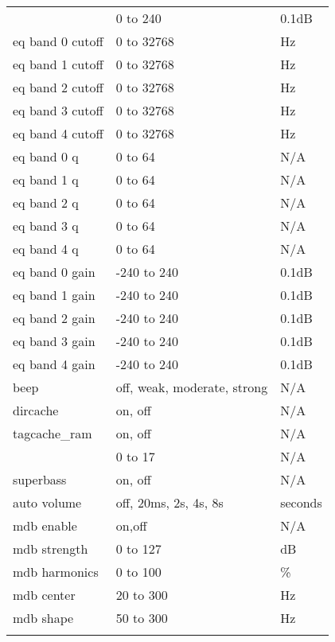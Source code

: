 \begin{center}
\begin{longtable}{@{}>{\raggedright}p{}@{}>{\raggedright}p{}@{}p{}@{}}
{      eq precut     & 0 to 240          & 0.1dB\\
      eq band 0 cutoff & 0 to 32768     & Hz\\
      eq band 1 cutoff & 0 to 32768     & Hz\\
      eq band 2 cutoff & 0 to 32768     & Hz\\
      eq band 3 cutoff & 0 to 32768     & Hz\\
      eq band 4 cutoff & 0 to 32768     & Hz\\
      eq band 0 q   & 0 to 64           & N/A\\
      eq band 1 q   & 0 to 64           & N/A\\
      eq band 2 q   & 0 to 64           & N/A\\
      eq band 3 q   & 0 to 64           & N/A\\
      eq band 4 q   & 0 to 64           & N/A\\
      eq band 0 gain & -240 to 240      & 0.1dB\\
      eq band 1 gain & -240 to 240      & 0.1dB\\
      eq band 2 gain & -240 to 240      & 0.1dB\\
      eq band 3 gain & -240 to 240      & 0.1dB\\
      eq band 4 gain & -240 to 240      & 0.1dB\\
%
      beep          & off, weak, moderate, strong
                                        & N/A\\
      dircache      & on, off           & N/A\\
      tagcache\_ram & on, off           & N/A\\
    }%

    \opt{recorder,recorderv2fm}{
      loudness      & 0 to 17           & N/A\\
      superbass     & on, off           & N/A\\
      auto volume   & off, 20ms, 2s, 4s, 8s
                                        & seconds\\
      mdb enable    & on,off            & N/A\\
      mdb strength  & 0 to 127          & dB\\
      mdb harmonics & 0 to 100          & \%\\
      mdb center    & 20 to 300         & Hz\\
      mdb shape     & 50 to 300         & Hz\\
    }%


\end{longtable}
\end{center}
